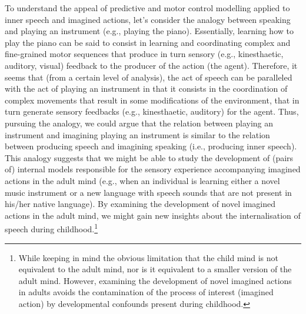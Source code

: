 \documentclass[a4paper,12pt,twoside,onecolumn,openright,final,oldfontcommands]{memoir}
\let\rmarkdownfootnote\footnote%
\def\footnote{\protect\rmarkdownfootnote}
\begin{document}
To understand the appeal of predictive and motor control modelling applied to inner speech and imagined actions, let's consider the analogy between speaking and playing an instrument (e.g., playing the piano). Essentially, learning how to play the piano can be said to consist in learning and coordinating complex and fine-grained motor sequences that produce in turn sensory (e.g., kinesthaetic, auditory, visual) feedback to the producer of the action (the agent). Therefore, it seems that (from a certain level of analysis), the act of speech can be paralleled with the act of playing an instrument in that it consists in the coordination of complex movements that result in some modifications of the environment, that in turn generate sensory feedbacks (e.g., kinesthaetic, auditory) for the agent. Thus, pursuing the analogy, we could argue that the relation between playing an instrument and imagining playing an instrument is similar to the relation between producing speech and imagining speaking (i.e., producing inner speech). This analogy suggests that we might be able to study the development of (pairs of) internal models responsible for the sensory experience accompanying imagined actions in the adult mind (e.g., when an individual is learning either a novel music instrument or a new language with speech sounds that are not present in his/her native language). By examining the development of novel imagined actions in the adult mind, we might gain new insights about the internalisation of speech during childhood.\footnote{While keeping in mind the obvious limitation that the child mind is not equivalent to the adult mind, nor is it equivalent to a smaller version of the adult mind. However, examining the development of novel imagined actions in adults avoids the contamination of the process of interest (imagined action) by developmental confounds present during childhood.}
\end{document}
